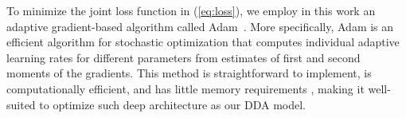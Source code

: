 
To minimize the joint loss function in (\ref{eq:loss}), we employ in this work an adaptive gradient-based algorithm called Adam~\cite{kingma2014adam}. More specifically, Adam is an efficient algorithm for stochastic optimization that computes individual adaptive learning rates for different parameters from estimates of first and second moments of the gradients. This method is straightforward to implement, is computationally efficient, and has little memory requirements \cite{kingma2014adam}, making it well-suited to optimize such deep architecture as our DDA model.




